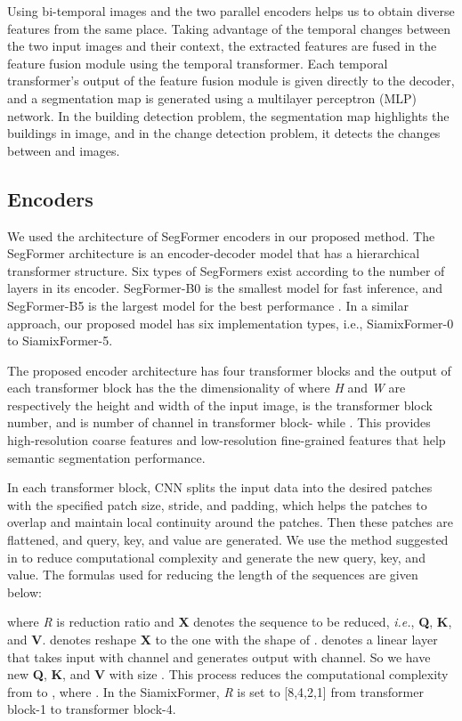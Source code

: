 \documentclass{article}
\begin{document}
Using bi-temporal images and the two parallel encoders helps us to obtain diverse features from the same place. Taking advantage of the temporal changes between the two input images and their context, the extracted features are fused in the feature fusion module using the temporal transformer. 
Each temporal transformer's output of the feature fusion module is given directly to the decoder, and a segmentation map is generated using a multilayer perceptron (MLP) network. In the building detection problem, the segmentation map highlights the buildings in  image, and in the change detection problem, it detects the changes between  and  images.


\subsection{Encoders}
We used the architecture of SegFormer encoders in our proposed method. The SegFormer architecture is an encoder-decoder model that has a hierarchical transformer structure. Six types of SegFormers exist according to the number of layers in its encoder. SegFormer-B0 is the smallest model for fast inference, and SegFormer-B5 is the largest model for the best performance \cite{xie2021segformer}. In a similar approach, our proposed model has six implementation types, i.e., SiamixFormer-0 to SiamixFormer-5.

The proposed encoder architecture has four transformer blocks and the output of each transformer block has the the dimensionality of  where \textit{H} and \textit{W} are respectively the height and width of the input image,   is the transformer block number, and  is number of channel in transformer block- while . This provides high-resolution coarse features and low-resolution fine-grained features that help semantic segmentation performance.

In each transformer block, CNN splits the input data into the desired patches with the specified patch size, stride, and padding, which helps the patches to overlap and maintain local continuity around the patches. Then these patches are flattened, and query, key, and value are generated. We use the method suggested in \cite{wang2021pyramid} to reduce computational complexity and generate the new query, key, and value. The formulas used for reducing the length of the sequences are given below:

 where \textit{R} is reduction ratio and \textbf{X} denotes the sequence to be reduced, \textit{i.e.}, \textbf{Q}, \textbf{K}, and \textbf{V}.  denotes reshape \textbf{X} to the one with the shape of .  denotes a linear layer that takes input with  channel and generates output with  channel. So we  have new \textbf{Q}, \textbf{K}, and \textbf{V} with size . This process reduces the computational complexity from  to , where . In the SiamixFormer, \textit{R} is set to [8,4,2,1] from transformer block-1 to transformer block-4. 
\end{document}
